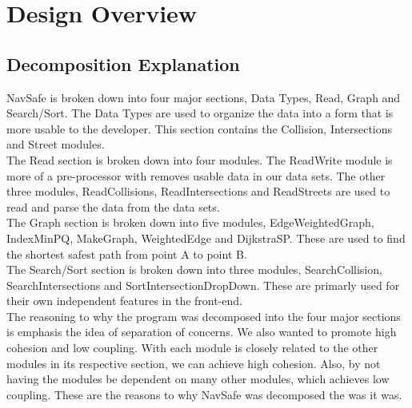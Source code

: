 \documentclass[12pt]{article}
\begin{document}
\newpage

\tableofcontents
\newpage

\section{Design Overview}
    \subsection{Decomposition Explanation}
    NavSafe is broken down into four major sections, Data Types, Read, Graph and Search/Sort. The Data Types are used to organize the data into a form that is more usable to the developer. This section contains the Collision, Intersections and Street modules.\\
    
    \noindent The Read section is broken down into four modules. The ReadWrite module is more of a pre-processor with removes usable data in our data sets. The other three modules, ReadCollisions, ReadIntersections and ReadStreets are used to read and parse the data from the data sets.\\
    
    \noindent The Graph section is broken down into five modules, EdgeWeightedGraph, IndexMinPQ, MakeGraph, WeightedEdge and DijkstraSP. These are used to find the shortest safest path from point A to point B.\\
    
    \noindent The Search/Sort section is broken down into three modules, SearchCollision, SearchIntersections and SortIntersectionDropDown. These are primarly used for their own independent features in the front-end.\\
    
    \noindent The reasoning to why the program was decomposed into the four major sections is emphasis the idea of separation of concerns. We also wanted to promote high cohesion and low coupling. With each module is closely related to the other modules in its respective section, we can achieve high cohesion. Also, by not having the modules be dependent on many other modules, which achieves low coupling. These are the reasons to why NavSafe was decomposed the was it was.
    
\end{document}
